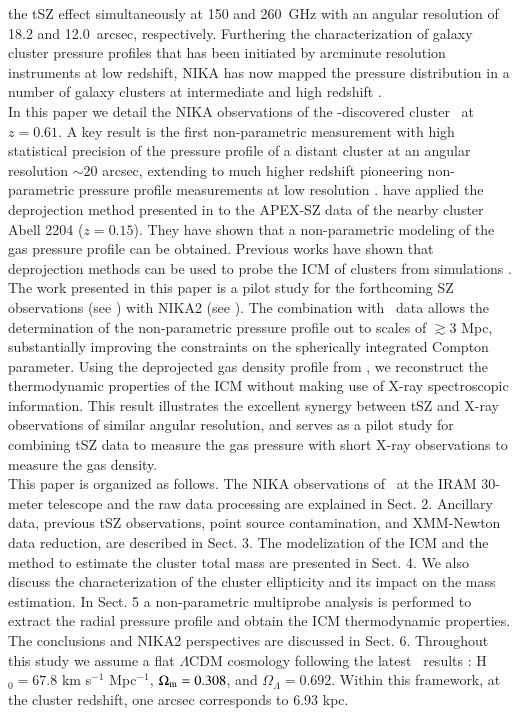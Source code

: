 \documentclass[traditabstract]{aa}
\begin{document}
the tSZ effect simultaneously at 150 and 260~GHz with an angular resolution
of 18.2 and 12.0~arcsec, respectively. Furthering  the characterization of galaxy cluster pressure profiles that has been initiated by arcminute resolution instruments at low redshift, NIKA  has now mapped the pressure distribution in a number of galaxy clusters at intermediate and high redshift \citep[see][]{RXJ1347NIKA,CLJ1227NIKA,MACSJ1424NIKA,MACSJ0717NIKA}.\\
In this paper we detail the NIKA observations of the \planck-discovered cluster \psz\ at $z=0.61$. A key result is the first non-parametric measurement with high statistical precision of the pressure profile of a distant cluster at an angular resolution $\sim 20$ arcsec, extending to much higher redshift pioneering non-parametric pressure profile measurements at low resolution \citep{NonparamPressure}. \citealt{NonparamPressure} have applied the deprojection method presented in \citealt{NonparamNord} to the APEX-SZ data \citep{NonparamApex} of the nearby cluster Abell 2204 ($z=0.15$). They have shown that a non-parametric modeling of the gas pressure profile can be obtained. Previous works have shown that deprojection methods can be used to probe the ICM of clusters from simulations \citep{NonparamSimu1,NonparamSimu2,NonparamSimu3}.\\
The work presented in this paper is a pilot study for the forthcoming SZ observations (see \citealt{ProceedingMoriond}) with NIKA2 (see \citealt{ProceedingSPIE}). The combination with \planck\ data allows the determination of the non-parametric pressure profile out to scales of $\gtrsim 3$ Mpc, substantially improving the constraints on the spherically integrated Compton parameter. Using the deprojected gas density profile from \xmm, we reconstruct the thermodynamic properties of the ICM without making use of  X-ray spectroscopic information. This result illustrates the excellent synergy between tSZ and X-ray observations of similar angular resolution, and serves as a pilot study for combining tSZ data to measure the gas pressure with short X-ray observations to measure the gas density.\\
This paper is organized as follows. The NIKA observations of \psz\ at the IRAM 30-meter telescope and the raw data processing are explained in Sect. 2. Ancillary data, previous tSZ observations, point source contamination, and XMM-Newton data reduction, are described in Sect. 3. The modelization of the ICM and the method to estimate the cluster total mass are presented in Sect. 4. We also discuss the characterization of the cluster ellipticity and its impact on the mass estimation. In Sect. 5 a non-parametric multiprobe analysis is performed to extract the radial pressure profile and obtain the ICM thermodynamic properties. The conclusions and NIKA2 perspectives are discussed in Sect. 6. Throughout this study we assume a flat $\Lambda$CDM cosmology following the latest \planck\ results \citep{Planck_param}: H$_0 = 67.8$ km s$^{-1}$ Mpc$^{-1}$, $\Omega_{\rm m} = 0.308$, and $\Omega_\Lambda = 0.692$. Within this framework, at the cluster redshift, one arcsec corresponds to 6.93 kpc.
\end{document}
